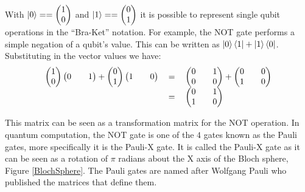 With
$\left\vert{0}\right\rangle
== 
\begin {pmatrix}
1\\
0\\
\end{pmatrix}
$
and
$\left\vert{1}\right\rangle
==  
\begin {pmatrix}
0\\
1\\
\end{pmatrix}
$
it is possible to represent single qubit operations in the ``Bra-Ket'' notation.
For example, the NOT gate performs a simple negation of a qubit's value.
This can be written as $\left\vert{0}\right\rangle\left\langle{1}\right\vert + \left\vert{1}\right\rangle\left\langle{0}\right\vert$.
Substituting in the vector values we have:
\begin{equation}
\begin{tabular}{ r c l }
\(\begin {pmatrix}
1\\
0
\end{pmatrix}
\begin {pmatrix}
0&&
1
\end{pmatrix}
 + 
\begin {pmatrix}
0\\
1
\end{pmatrix}
\begin {pmatrix}
1&&
0
\end{pmatrix}\)
& \(=\)
& \( 
\begin{pmatrix}
0 && 1 \\
0 && 0
\end{pmatrix}
 + 
\begin{pmatrix}
0 && 0\\
1 && 0
\end{pmatrix}
\) \\
& \(=\)
& \( 
\begin{pmatrix}
0 && 1 \\
1 && 0
\end{pmatrix}
\)
\end{tabular}
\label{eq:notexplanded}
\end{equation}

This matrix can be seen as a transformation matrix for the NOT operation.
In quantum computation, the NOT gate is one of the $4$ gates known as the Pauli gates, more specifically it is the Pauli-X gate.
It is called the Pauli-X gate as it can be seen as a rotation of $\pi$ radians about the X axis of the Bloch sphere, Figure \ref{BlochSphere}.
The Pauli gates are named after Wolfgang Pauli who published the matrices that define them.

